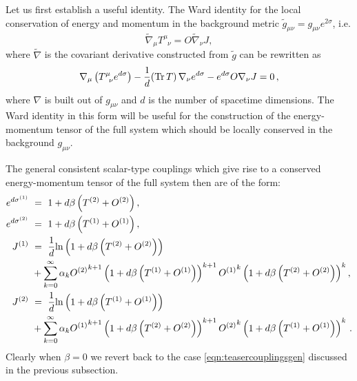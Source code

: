 \documentclass[prd,reprint,a4paper,showpacs,superscriptaddress,11pt,onecolumn,nofootinbib]{revtex4-1}
\renewcommand{\(}{\left(}
\renewcommand{\)}{\right)}
\newcommand{\6}{\partial}
\begin{document}
Let us first establish a useful identity. The Ward identity for the local conservation of energy and momentum in the background metric $\tilde{g}_{\mu\nu} = g_{\mu\nu} e^{2\sigma}$, i.e.
\begin{equation}
\tilde{\nabla}_\mu T^{\mu}_{\phantom{\mu}\nu} = O \tilde{\nabla}_\nu J,
\end{equation}
where $\tilde\nabla$ is the covariant derivative constructed from $\tilde{g}$ can be rewritten as
\begin{equation}\label{eqn:scalarwardidentity}
\nabla_\mu \left(T^{\mu}_{\phantom{\mu}\nu}e^{d\sigma}\right) - \frac{1}{d} ({\rm Tr} \, T)\, \nabla_\nu e^{d\sigma}-e^{d\sigma}O \nabla_\nu J = 0 \, ,
\end{equation}
where $\nabla$ is built out of $g_{\mu\nu}$ and $d$ is the number of spacetime dimensions. The Ward identity in this form will be useful for the construction of the energy-momentum tensor of the full system which should be locally conserved in the background $g_{\mu\nu}$.

The general consistent scalar-type couplings which give rise to a conserved energy-momentum tensor of the full system then are of the form:
\begin{subequations}
\label{allequations}
\begin{align}
e^{d\sigma^{(1)}} ~ &= ~ 1 +d \beta \left(T^{(2)} + O^{(2)}\right) ,\label{eqn:sigma1}\\
e^{d\sigma^{(2)}} ~ &= ~ 1+ d \beta  \left(T^{(1)} + O^{(1)}\right), \label{eqn:sigma2}\\
J^{(1)} ~ &= ~ \frac{1}{d}{\rm ln} \left(1 +d\beta\left(T^{(2)} + O^{(2)}\right)\right) \nonumber\\&+ \sum_{k = 0}^\infty\alpha_k {O^{(2)}}^{k+1}\left(1 +d\beta\left(T^{(1)} + O^{(1)}\right)\right)^{k+1}  {O^{(1)}}^k \left(1 +d\beta\left(T^{(2)} + O^{(2)}\right)\right)^k , \label{eqn:J1}\\
J^{(2)} ~ &= ~ \frac{1}{d}{\rm ln} \left(1 + d\beta\left(T^{(1)} + O^{(1)}\right)\right) \nonumber\\&+ \sum_{k = 0}^\infty\alpha_k {O^{(1)}}^{k+1}\left(1 +d\beta\left(T^{(2)} + O^{(2)}\right)\right)^{k+1}  {O^{(2)}}^k \left(1 +d\beta\left(T^{(1)} + O^{(1)}\right)\right)^k\, . \label{eqn:J2}
\end{align}
\end{subequations}
Clearly when $\beta = 0$ we revert back to the case \eqref{eqn:teasercouplingsgen} discussed in the previous subsection.
\end{document}

